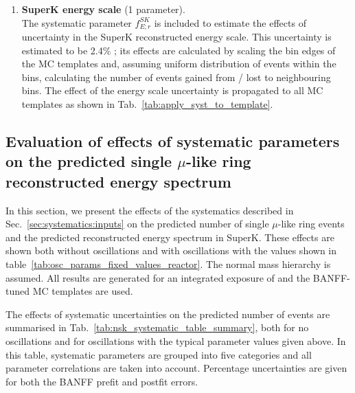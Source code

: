 \begin{enumerate}
We consider the SuperK detector efficiency and FSI+SI systematics together, and add their covariance matrices linearly. Each of
these covariance matrices has six correlated parameters, corresponding to different modes and reconstructed energy bins, as shown in
Tab.~\ref{tab:fsi_si_params}. The effects of these uncertainties are also evaluated using the Cholesky method. \\

\item
{\bf SuperK energy scale} (1 parameter).\\

The systematic parameter $f_{E; r}^{SK}$ is included to estimate the effects of uncertainty in the SuperK reconstructed energy scale.
This uncertainty is estimated to be 2.4\% \cite{SuperkEScale2013}; its effects are calculated by scaling the bin edges of
the MC templates and, assuming uniform distribution of events within the bins, calculating the number
of events gained from / lost to neighbouring bins.
The effect of the energy scale uncertainty is propagated to all MC templates as shown in Tab.~\ref{tab:apply_syst_to_template}. \\

\end{enumerate}

\afterpage{}


\clearpage

\subsection {Evaluation of effects of systematic parameters on the predicted single $\mu$-like ring reconstructed energy spectrum}
\label{sec:systematics:evaluation}

In this section, we present the effects of the systematics described in Sec.~\ref{sec:systematics:inputs}
on the predicted number of single $\mu$-like ring events and the predicted reconstructed energy spectrum in SuperK.
These effects are shown both without oscillations and with oscillations with
the values shown in table~\ref{tab:osc_params_fixed_values_reactor}.
The normal mass hierarchy is assumed.
All results are generated for an integrated exposure of \TotalPot and
the BANFF-tuned MC templates are used.

The effects of systematic uncertainties on the predicted number of events are summarised in Tab.~\ref{tab:nsk_systematic_table_summary}, 
both for no oscillations and for oscillations with the typical parameter values given above.
In this table, systematic parameters are grouped into five categories and all parameter correlations are taken into account.
Percentage uncertainties are given for both the BANFF prefit and postfit errors.

